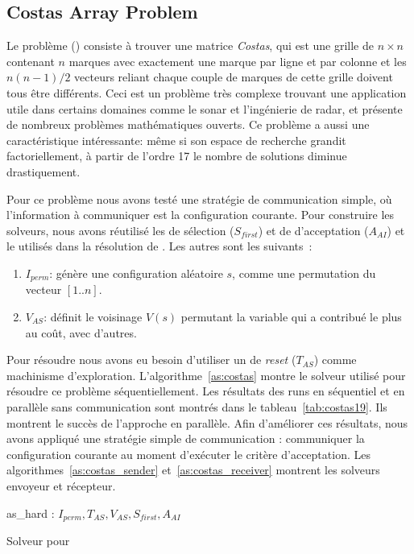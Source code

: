 \subsection{Costas Array Problem}

Le problème \carr{} (\CARRP) consiste à trouver une matrice {\it Costas}, qui est une grille de $n \times n$ contenant $n$ marques avec exactement une marque par ligne et par colonne et les $n(n-1)/2 $ vecteurs reliant chaque couple de marques de cette grille doivent tous être différents. Ceci est un problème très complexe trouvant une application utile dans certains domaines comme le sonar et l'ingénierie de radar, et présente de nombreux problèmes mathématiques ouverts. Ce problème a aussi une caractéristique intéressante: même si son espace de recherche grandit factoriellement, à partir de l'ordre 17 le nombre de solutions diminue drastiquement.

Pour ce problème nous avons testé une stratégie de communication simple, où l'information à communiquer est la configuration courante. Pour construire les solveurs, nous avons réutilisé les \oms{} de sélection ($S_{first}$) et de d'acceptation ($A_{AI}$) et le \opch{} utilisés dans la résolution de \SGP{}. Les autres \oms{} sont les suivants~:

\begin{enumerate}
	\item $I_{perm}$: génère une configuration aléatoire $s$, comme une permutation du vecteur $[1..n]$. 
	\item $V_{AS}$: définit le voisinage $V \left(s\right)$ permutant la variable qui a contribué le plus au coût, avec d'autres.
\end{enumerate}

Pour résoudre \CARRP{} nous avons eu besoin d'utiliser un \om{} de \textit{reset} ($T_{AS}$) comme machinisme d'exploration. L'algorithme~\ref{as:costas} montre le solveur utilisé pour résoudre ce problème séquentiellement. Les résultats des runs en séquentiel et en parallèle sans communication sont montrés dans le tableau~\ref{tab:costas19}. Ils montrent le succès de l'approche en parallèle. Afin d'améliorer ces résultats, nous avons appliqué une stratégie simple de communication : communiquer la configuration courante au moment d'exécuter le critère d'acceptation. Les algorithmes~\ref{as:costas_sender} et~\ref{as:costas_receiver} montrent les solveurs envoyeur et récepteur.

\begin{algorithm}[!h]
\dontprintsemicolon
\SetNoline
{}
   as\_hard\;
\algoindent{} : $I_{perm}, T_{AS}, V_{AS}, S_{first}, A_{AI}$ \;
\caption{Solveur pour \CARRP}\label{as:costas}
\end{algorithm}

